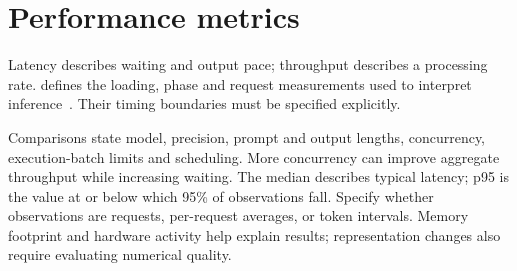 
\section{Performance metrics}
\label{sec:metrics}

Latency describes waiting and output pace; throughput describes a
processing rate.   defines the loading,
phase and request measurements used to interpret inference~\cite{vllm2026}.
Their timing boundaries must be specified explicitly.

Comparisons state model, precision, prompt and output lengths, concurrency,
execution-batch limits and scheduling.  More concurrency can improve
aggregate throughput while increasing waiting.  The median describes
typical latency; p95 is the value at or below which 95\% of observations
fall.  Specify whether observations are requests, per-request averages,
or token intervals.  Memory footprint and hardware activity help explain
results; representation changes also require evaluating numerical quality.

